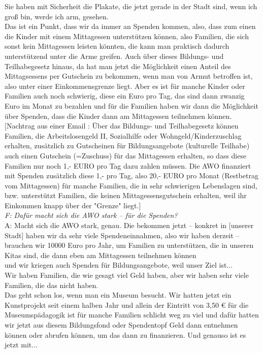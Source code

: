\begin{linenumbers*}
Sie haben mit Sicherheit die Plakate, die jetzt gerade in der Stadt sind, wenn ich groß bin, werde ich arm, gesehen.\\
Das ist ein Punkt, dass wir da immer an Spenden kommen, also, dass zum einen die Kinder mit einem Mittagessen unterstützen können, also Familien, die sich sonst kein Mittagessen leisten könnten, die kann man praktisch dadurch unterstützend unter die Arme greifen. Auch über dieses Bildungs- und Teilhabegesetz hinaus, da hat man jetzt die Möglichkeit einen Anteil des Mittagsessens per Gutschein zu bekommen, wenn man von Armut betroffen ist, also unter einer Einkommensgrenze liegt. Aber es ist für manche Kinder oder Familien auch noch schwierig, diese ein Euro pro Tag, das sind dann zwanzig Euro im Monat zu bezahlen und für die Familien haben wir dann die Möglichkeit über Spenden, dass die Kinder dann am Mittagessen teilnehmen können.\\
{[Nachtrag aus einer Email : Über das Bildungs- und Teilhabegesetz können Familien, die Arbeitslosengeld II, Sozialhilfe oder Wohngeld/Kinderzuschlag erhalten, zusätzlich zu Gutscheinen für Bildungsangebote (kulturelle Teilhabe) auch einen Gutschein (=Zuschuss) für das Mittagessen erhalten, so dass diese Familien nur noch 1,- EURO pro Tag dazu zahlen müssen. 
Die AWO finanziert mit Spenden zusätzlich diese 1,- pro Tag, also 20,- EURO pro
Monat (Restbetrag vom Mittagessen) für manche Familien, die in sehr schwierigen
Lebenslagen sind, bzw. unterstützt Familien, die keinen Mittagessensgutschein
erhalten, weil ihr Einkommen knapp über der "Grenze" liegt.]}\\
\emph{F: Dafür macht sich die AWO stark -- für die Spenden?}\\
A: Macht sich die AWO stark, genau. Die bekommen jetzt -- konkret in {[unserer Stadt]} haben wir da sehr viele Spendeneinnahmen, also wir haben derzeit -- brauchen wir 10000 Euro pro Jahr, um Familien zu unterstützen, die in unseren Kitas sind, die dann eben am Mittagessen teilnehmen können \\
und wir kriegen auch Spenden für Bildungsangebote, weil unser Ziel ist...\\
Wir haben Familien, die wie gesagt viel Geld haben, aber wir haben sehr viele Familien, die das nicht haben.\\
Das geht schon los, wenn man ein Museum besucht. Wir hatten jetzt ein Kunstprojekt seit einem halben Jahr und allein der Eintritt von 3,50 € für die Museumspädagogik ist für manche Familien schlicht weg zu viel und dafür hatten wir jetzt aus diesem Bildungsfond oder Spendentopf Geld dann entnehmen können oder abrufen können, um das dann zu finanzieren. Und genauso ist es jetzt mit...\\

\end{linenumbers*}
